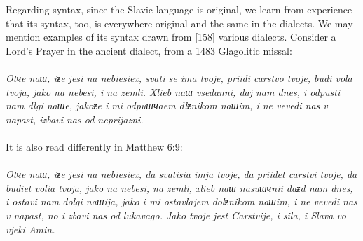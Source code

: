 Regarding syntax, since the Slavic language is original, we learn from experience that its syntax, too, is everywhere original and the same in the dialects. We may mention examples of its syntax drawn from [158] various dialects. Consider a Lord’s Prayer in the ancient dialect, from a 1483 Glagolitic missal: \\
\\
\indent \textit{Otчe naш, iƶe jesi na nebiesiex, svati se ima tvoje, priidi carstvo tvoje, budi vola tvoja, jako na nebesi, i na zemli. Xlieb naш vsedanni, daj nam dnes, i odpusti nam dlgi naшe, jakoƶe i mi odpuшчaem dlƶnikom naшim, i ne vevedi nas v napast, izbavi nas od neprijazni.} \\
\\
It is also read differently in Matthew 6:9: \\
\\
\indent \textit{Otчe naш, iƶe jesi na nebiesiex, da svatisia imja tvoje, da priidet carstvi tvoje, da budiet volia tvoja, jako na nebesi, na zemli, xlieb naш nasuшчnii daƶd nam dnes, i ostavi nam dolgi naшija, jako i mi ostavlajem dolƶnikom naшim, i ne vevedi nas v napast, no i zbavi nas od lukavago. Jako tvoje jest Carstvije, i sila, i Slava vo vjeki Amin.} \\
\\
